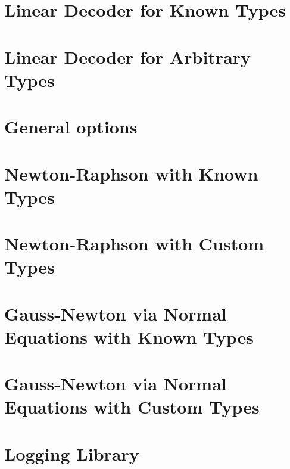 \let\mypdfximage\pdfximage\def\pdfximage{\immediate\mypdfximage}\documentclass[twoside]{book}
\newcommand{\+}{\discretionary{\mbox{\scriptsize$\hookleftarrow$}}{}{}}
\newcommand{\clearemptydoublepage}{%
  \newpage{\pagestyle{empty}\cleardoublepage}%
}
\begin{document}
\chapter{Linear Decoder for Known Types}
\label{md_pages_rom_tutorial_lin_dec}

\chapter{Linear Decoder for Arbitrary Types}
\label{md_pages_rom_tutorial_lin_dec_custom_types}

\chapter{General options}
\label{md_pages_solvers_nonlinear_tutorial_0}

\chapter{Newton-\/\+Raphson with Known Types}
\label{md_pages_solvers_nonlinear_tutorial_1}

\chapter{Newton-\/\+Raphson with Custom Types}
\label{md_pages_solvers_nonlinear_tutorial_2}

\chapter{Gauss-\/\+Newton via Normal Equations with Known Types}
\label{md_pages_solvers_nonlinear_tutorial_3}

\chapter{Gauss-\/\+Newton via Normal Equations with Custom Types}
\label{md_pages_solvers_nonlinear_tutorial_4}

\chapter{Logging Library}
\label{md_pages_utils_logger}


\backmatter
\newpage
{}
\clearemptydoublepage
{}
\printindex
\end{document}

